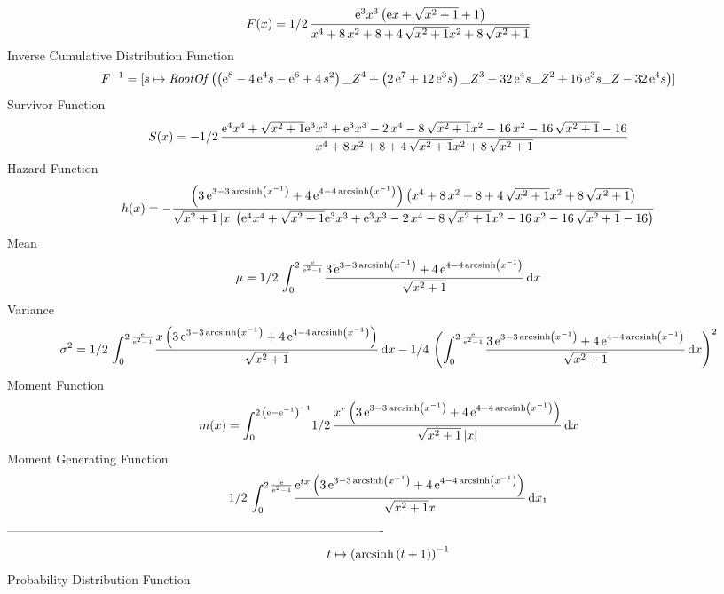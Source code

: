 \documentclass[12pt]{article}
\begin{document}
 $$F(x)=1/2\,{\frac {{{\rm e}^{3}}{x}^{3} \left( {\rm e}x+\sqrt {{x}^{2}+1}+1
 \right) }{{x}^{4}+8\,{x}^{2}+8+4\,\sqrt {{x}^{2}+1}{x}^{2}+8\,\sqrt {
{x}^{2}+1}}}
$$ Inverse Cumulative Distribution Function 
  $$F^{-1} = [s\mapsto {\it RootOf} \left(  \left( {{\rm e}^{8}}-4\,{{\rm e}^{4}}s-
{{\rm e}^{6}}+4\,{s}^{2} \right) {{\it \_Z}}^{4}+ \left( 2\,{{\rm e}^{
7}}+12\,{{\rm e}^{3}}s \right) {{\it \_Z}}^{3}-32\,{{\rm e}^{4}}s{{
\it \_Z}}^{2}+16\,{{\rm e}^{3}}s{\it \_Z}-32\,{{\rm e}^{4}}s \right) ]
$$Survivor Function 
 $$ S(x)=-1/2\,{\frac {{{\rm e}^{4}}{x}^{4}+\sqrt {{x}^{2}+1}{{\rm e}^{3}}{x}^{
3}+{{\rm e}^{3}}{x}^{3}-2\,{x}^{4}-8\,\sqrt {{x}^{2}+1}{x}^{2}-16\,{x}
^{2}-16\,\sqrt {{x}^{2}+1}-16}{{x}^{4}+8\,{x}^{2}+8+4\,\sqrt {{x}^{2}+
1}{x}^{2}+8\,\sqrt {{x}^{2}+1}}}
$$ Hazard Function 
 $$ h(x)=-{\frac { \left( 3\,{{\rm e}^{3-3\,{\rm arcsinh} \left({x}^{-1}\right)
}}+4\,{{\rm e}^{4-4\,{\rm arcsinh} \left({x}^{-1}\right)}} \right) 
 \left( {x}^{4}+8\,{x}^{2}+8+4\,\sqrt {{x}^{2}+1}{x}^{2}+8\,\sqrt {{x}
^{2}+1} \right) }{\sqrt {{x}^{2}+1} \left| x \right|  \left( {{\rm e}^
{4}}{x}^{4}+\sqrt {{x}^{2}+1}{{\rm e}^{3}}{x}^{3}+{{\rm e}^{3}}{x}^{3}
-2\,{x}^{4}-8\,\sqrt {{x}^{2}+1}{x}^{2}-16\,{x}^{2}-16\,\sqrt {{x}^{2}
+1}-16 \right) }}
$$Mean 
 $$ \mu=1/2\,\int_{0}^{2\,{\frac {{\rm e}}{{{\rm e}^{2}}-1}}}\!{\frac {3\,{
{\rm e}^{3-3\,{\rm arcsinh} \left({x}^{-1}\right)}}+4\,{{\rm e}^{4-4\,
{\rm arcsinh} \left({x}^{-1}\right)}}}{\sqrt {{x}^{2}+1}}}\,{\rm d}x
$$ Variance 
 $$ \sigma^2 = 1/2\,\int_{0}^{2\,{\frac {{\rm e}}{{{\rm e}^{2}}-1}}}\!{\frac {x
 \left( 3\,{{\rm e}^{3-3\,{\rm arcsinh} \left({x}^{-1}\right)}}+4\,{
{\rm e}^{4-4\,{\rm arcsinh} \left({x}^{-1}\right)}} \right) }{\sqrt {{
x}^{2}+1}}}\,{\rm d}x-1/4\, \left( \int_{0}^{2\,{\frac {{\rm e}}{{
{\rm e}^{2}}-1}}}\!{\frac {3\,{{\rm e}^{3-3\,{\rm arcsinh} \left({x}^{
-1}\right)}}+4\,{{\rm e}^{4-4\,{\rm arcsinh} \left({x}^{-1}\right)}}}{
\sqrt {{x}^{2}+1}}}\,{\rm d}x \right) ^{2}
$$Moment Function 
 $$ m(x) = \int_{0}^{2\, \left( {\rm e}-{{\rm e}^{-1}} \right) ^{-1}}\!1/2\,{
\frac {{x}^{r} \left( 3\,{{\rm e}^{3-3\,{\rm arcsinh} \left({x}^{-1}
\right)}}+4\,{{\rm e}^{4-4\,{\rm arcsinh} \left({x}^{-1}\right)}}
 \right) }{\sqrt {{x}^{2}+1} \left| x \right| }}\,{\rm d}x
$$ Moment Generating Function 
 $$1/2\,\int_{0}^{2\,{\frac {{\rm e}}{{{\rm e}^{2}}-1}}}\!{\frac {{
{\rm e}^{tx}} \left( 3\,{{\rm e}^{3-3\,{\rm arcsinh} \left({x}^{-1}
\right)}}+4\,{{\rm e}^{4-4\,{\rm arcsinh} \left({x}^{-1}\right)}}
 \right) }{\sqrt {{x}^{2}+1}x}}\,{\rm d}x_{{1}}
$$-------------------------------------------------------------------------------------------  \\$$t\mapsto  \left( {\rm arcsinh} \left(t+1\right) \right) ^{-1}
$$Probability Distribution Function 
\end{document}
